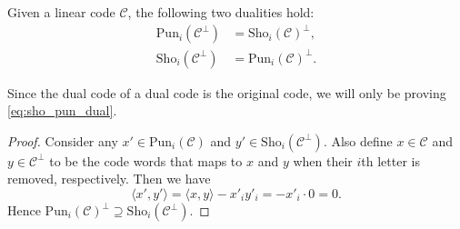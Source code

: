 \begin{theorem}
    Given a linear code $\mathcal{C}$, the following two dualities hold:
    \begin{align}
        \mathrm{Pun}_i(\mathcal{C}^\perp) &= \mathrm{Sho}_i(\mathcal{C})^\perp, \\
        \mathrm{Sho}_i(\mathcal{C}^\perp) &= \mathrm{Pun}_i(\mathcal{C})^\perp. \label{eq:sho_pun_dual}
    \end{align}
\end{theorem}
Since the dual code of a dual code is the original code, we will only be proving \autoref{eq:sho_pun_dual}.
\begin{proof}
    Consider any $x'\in\mathrm{Pun}_i(\mathcal{C})$ and $y'\in\mathrm{Sho}_i(\mathcal{C}^\perp)$. Also define $x\in\mathcal{C}$ and $y\in\mathcal{C}^\perp$ to be the code words that maps to $x$ and $y$ when their $i$th letter is removed, respectively. Then we have
    \begin{equation*}
        \langle x',y'\rangle = \langle x,y\rangle - x'_iy'_i = -x'_i\cdot 0 = 0.
    \end{equation*}
    Hence $\mathrm{Pun}_i(\mathcal{C})^\perp \supseteq \mathrm{Sho}_i(\mathcal{C}^\perp)$.


\end{proof}
